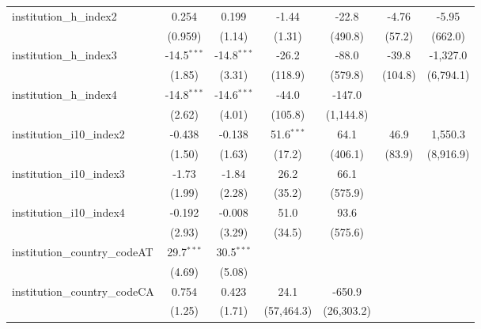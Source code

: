 \begin{tabular}{lcccccc}
   institution\_h\_index2                & 0.254         & 0.199         & -1.44        & -22.8      & -4.76     & -5.95\\   
                                         & (0.959)       & (1.14)        & (1.31)       & (490.8)    & (57.2)    & (662.0)\\   
   institution\_h\_index3                & -14.5$^{***}$ & -14.8$^{***}$ & -26.2        & -88.0      & -39.8     & -1,327.0\\   
                                         & (1.85)        & (3.31)        & (118.9)      & (579.8)    & (104.8)   & (6,794.1)\\   
   institution\_h\_index4                & -14.8$^{***}$ & -14.6$^{***}$ & -44.0        & -147.0     &           &   \\   
                                         & (2.62)        & (4.01)        & (105.8)      & (1,144.8)  &           &   \\   
   institution\_i10\_index2              & -0.438        & -0.138        & 51.6$^{***}$ & 64.1       & 46.9      & 1,550.3\\   
                                         & (1.50)        & (1.63)        & (17.2)       & (406.1)    & (83.9)    & (8,916.9)\\   
   institution\_i10\_index3              & -1.73         & -1.84         & 26.2         & 66.1       &           &   \\   
                                         & (1.99)        & (2.28)        & (35.2)       & (575.9)    &           &   \\   
   institution\_i10\_index4              & -0.192        & -0.008        & 51.0         & 93.6       &           &   \\   
                                         & (2.93)        & (3.29)        & (34.5)       & (575.6)    &           &   \\   
   institution\_country\_codeAT          & 29.7$^{***}$  & 30.5$^{***}$  &              &            &           &   \\   
                                         & (4.69)        & (5.08)        &              &            &           &   \\   
   institution\_country\_codeCA          & 0.754         & 0.423         & 24.1         & -650.9     &           &   \\   
                                         & (1.25)        & (1.71)        & (57,464.3)   & (26,303.2) &           &   \\   

\end{tabular}
